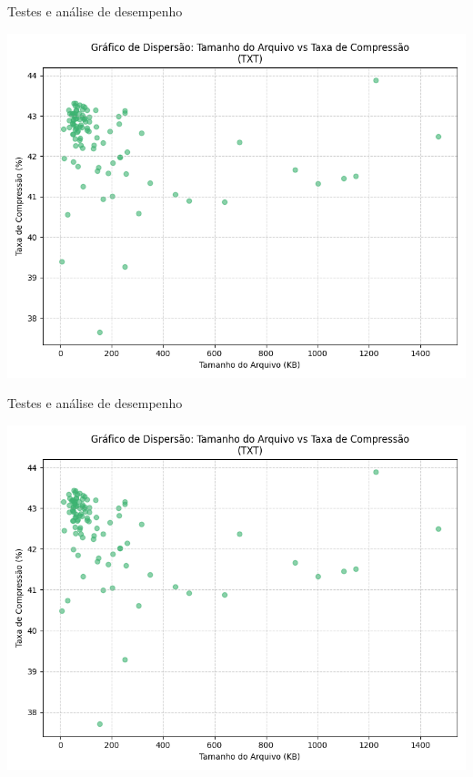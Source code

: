 \documentclass{beamer}
\begin{document}
\begin{frame}{Testes e análise de desempenho}
    \begin{center}
        \includegraphics[width=0.8\linewidth]{imagens/file_sizes_huffman1_txt_scatter_plot}
    \end{center}
\end{frame}

\begin{frame}{Testes e análise de desempenho}
    \begin{center}
        \includegraphics[width=0.8\linewidth]{imagens/file_sizes_huffman2_txt_scatter_plot}
    \end{center}
\end{frame}
\end{document}

